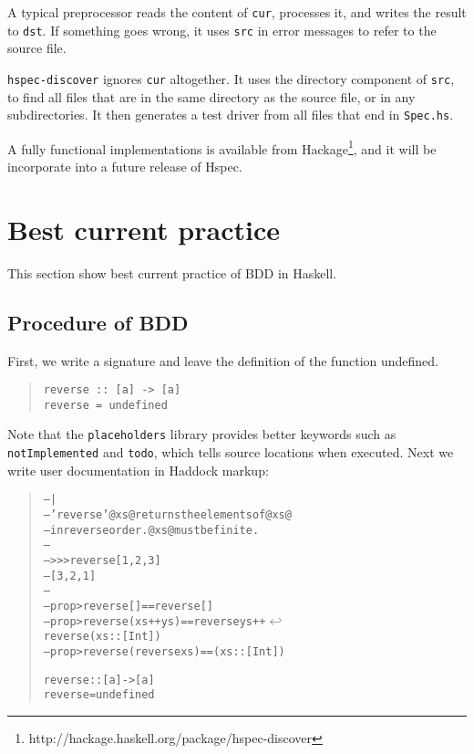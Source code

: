 \documentclass[preprint]{sigplanconf}
\begin{document}
\noindent A typical preprocessor reads the content of {\tt cur},
processes it, and writes the result to {\tt dst}.  If something goes
wrong, it uses {\tt src} in error messages to refer to the source
file.

\verb|hspec-discover| ignores {\tt cur} altogether.  It uses the
directory component of {\tt src}, to find all files that are in the
same directory as the source file, or in any subdirectories.  It then generates
a test driver from all files that end in {\tt Spec.hs}.

A fully functional implementations is available from
Hackage\footnote{http://hackage.haskell.org/package/hspec-discover},
and it will be incorporate into a future release of Hspec.

\section{Best current practice}
\label{ref:Best-current-practice}

This section show best current practice of
BDD in Haskell.

\subsection{Procedure of BDD}

First, we write a signature and leave the definition of the function undefined.

\begin{quote}
\small
\begin{verbatim}
reverse :: [a] -> [a]
reverse = undefined
\end{verbatim}
\end{quote}

\noindent Note that the {\tt placeholders} library provides better keywords such as {\tt notImplemented} and {\tt todo}, which tells source locations when executed.
Next we write user documentation in Haddock markup:

\begin{quote}
\small
\begin{alltt}
-- |
-- 'reverse' @xs@ returns the elements of @xs@
-- in reverse order. @xs@ must be finite.
--
-- >>> reverse [1,2,3]
-- [3,2,1]
--
-- prop> reverse [] == reverse []
-- prop> reverse (xs ++ ys) == reverse ys ++ \(\hookleftarrow\)
                               reverse (xs::[Int])
-- prop> reverse (reverse xs) == (xs::[Int])

reverse :: [a] -> [a]
reverse = undefined
\end{alltt}
\end{quote}
\end{document}
